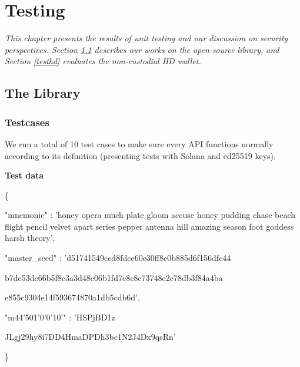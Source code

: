 \chapter{Testing}
\label{chap:testing}
\textit{This chapter presents the results of unit testing and our discussion on security perspectives. Section \ref{testlib} describes our works on the open-source library, and Section \ref{testhd} evaluates the non-custodial HD wallet.}

\minitoc

\section{The Library}
\label{testlib}
\subsection{Testcases}

We run a total of 10 test cases to make sure every API functions normally according to its definition (presenting tests with Solana and ed25519 keys). 

\bigskip
{\textbf{Test data}}

\begin{framed}
    \hspace*{13mm}        \{ \par
    \hspace*{13mm}        "mnemonic" : 'honey opera much plate gloom accuse honey pudding chase beach flight pencil velvet apart series pepper antenna hill amazing season foot goddess harsh theory',    \par
    \hspace*{13mm}        "master\_seed" : 'd51741549ced8fdce60e30ff8c0b885d6f156dfc44 \par
    \hspace*{27mm}         b7de53dc66b5f8c3a3d48e06b1fd7c8c8c73748e2e78db3f84a4ba \par
    \hspace*{27mm}         e855c9304e14f593674870a1db5cdb6d',    \par
    \hspace*{13mm}        "m\/44'\/501'\/0'\/0'\/10'" : 'HSPjBD1z \par
    \hspace*{37mm}        JLgj29hy8i7DD4HmaDPDh3bc1N2J4Dx9qsRn' \par
    \hspace*{13mm}              \} \par
    \end{framed}

